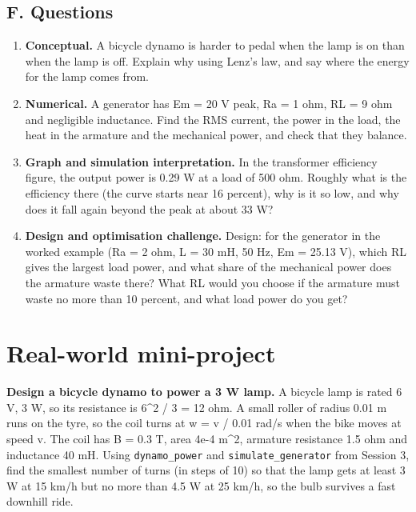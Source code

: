 \documentclass[11pt,a4paper]{article}
\begin{document}
\subsection*{F. Questions}
\begin{enumerate}[nosep]
\item \textbf{Conceptual.} A bicycle dynamo is harder to pedal when the lamp is on than when the lamp is off. Explain why using Lenz's law, and say where the energy for the lamp comes from.
\item \textbf{Numerical.} A generator has Em = 20 V peak, Ra = 1 ohm, RL = 9 ohm and negligible inductance. Find the RMS current, the power in the load, the heat in the armature and the mechanical power, and check that they balance.
\item \textbf{Graph and simulation interpretation.} In the transformer efficiency figure, the output power is 0.29 W at a load of 500 ohm. Roughly what is the efficiency there (the curve starts near 16 percent), why is it so low, and why does it fall again beyond the peak at about 33 W?
\item \textbf{Design and optimisation challenge.} Design: for the generator in the worked example (Ra = 2 ohm, L = 30 mH, 50 Hz, Em = 25.13 V), which RL gives the largest load power, and what share of the mechanical power does the armature waste there? What RL would you choose if the armature must waste no more than 10 percent, and what load power do you get?
\end{enumerate}

\section{Real-world mini-project}
\textbf{Design a bicycle dynamo to power a 3 W lamp.} A bicycle lamp is rated 6 V, 3 W, so its resistance is 6\textasciicircum{}2 / 3 = 12 ohm. A small roller of radius 0.01 m runs on the tyre, so the coil turns at w = v / 0.01 rad/s when the bike moves at speed v. The coil has B = 0.3 T, area 4e-4 m\textasciicircum{}2, armature resistance 1.5 ohm and inductance 40 mH. Using \texttt{dynamo\_power} and \texttt{simulate\_generator} from Session 3, find the smallest number of turns (in steps of 10) so that the lamp gets at least 3 W at 15 km/h but no more than 4.5 W at 25 km/h, so the bulb survives a fast downhill ride.
\end{document}
